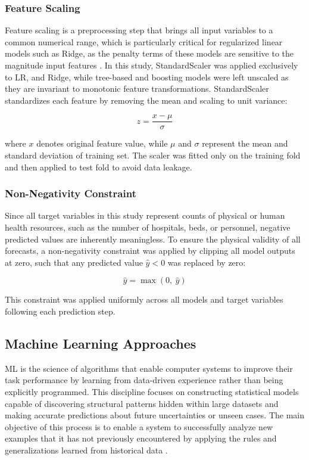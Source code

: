 \documentclass[final, 9pt, twocolumn]{saucis}
\begin{document}
\subsubsection{Feature Scaling}

Feature scaling is a preprocessing step that brings all input 
variables to a common numerical range, which is particularly 
critical for regularized linear models such as Ridge, as the penalty terms of these models are sensitive to the magnitude input features \cite{methodnew7}. In this study, StandardScaler was applied exclusively to LR, and Ridge, while tree-based and boosting models were left unscaled as they are invariant to monotonic feature transformations. StandardScaler standardizes each feature by removing the mean and scaling to unit variance:

\begin{equation}
    z = \frac{x - \mu}{\sigma}
\end{equation}

where $x$ denotes original feature value, while $\mu$ and $\sigma$ represent the mean and standard deviation of training set. The scaler was fitted only on the training fold and then applied to test fold to avoid data leakage.

\subsubsection{Non-Negativity Constraint}

Since all target variables in this study represent counts of 
physical or human health resources, such as the number of 
hospitals, beds, or personnel, negative predicted values are 
inherently meaningless. To ensure the physical validity of all 
forecasts, a non-negativity constraint was applied by clipping 
all model outputs at zero, such that any predicted value 
$\hat{y} < 0$ was replaced by zero:

\begin{equation}
    \hat{y} = \max(0,\ \hat{y})
\end{equation}

This constraint was applied uniformly across all models and 
target variables following each prediction step.

\subsection{Machine Learning Approaches}
ML is the science of algorithms that enable computer systems to improve their task performance by learning from data-driven experience rather than being explicitly programmed. This discipline focuses on constructing statistical models capable of discovering structural patterns hidden within large datasets and making accurate predictions about future uncertainties or unseen cases. The main objective of this process is to enable a system to successfully analyze new examples that it has not previously encountered by applying the rules and generalizations learned from historical data \cite{method6}.
\end{document}
